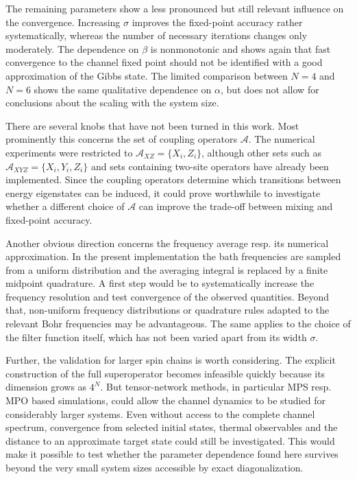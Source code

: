 \documentclass[12pt,a4paper]{article}
\begin{document}
The remaining parameters show a less pronounced but still relevant influence on the convergence. Increasing $\sigma$ improves the fixed-point accuracy rather systematically, whereas the number of necessary iterations changes only moderately. The dependence on $\beta$ is nonmonotonic and shows again that fast convergence to the channel fixed point should not be identified with a good approximation of the Gibbs state. The limited comparison between $N=4$ and $N=6$ shows the same qualitative dependence on $\alpha$, but does not allow for conclusions about the scaling with the system size.

There are several knobs that have not been turned in this work. Most prominently this concerns the set of coupling operators $\mathcal{A}$. The numerical experiments were restricted to $\mathcal{A}_{XZ}=\{X_i,Z_i\}$,
although other sets such as $\mathcal{A}_{XYZ}=\{X_i,Y_i,Z_i\}$
and sets containing two-site operators have already been implemented. Since the coupling operators determine which transitions between energy eigenstates can be induced, it could prove worthwhile to investigate whether a different choice of $\mathcal{A}$ can improve the trade-off between mixing and fixed-point accuracy.

Another obvious direction concerns the frequency average resp. its numerical approximation. In the present implementation the bath frequencies are sampled from a uniform distribution and the averaging integral is replaced by a finite midpoint quadrature. A first step would be to systematically increase the frequency resolution and test convergence of the observed quantities. Beyond that, non-uniform frequency distributions or quadrature rules adapted to the relevant Bohr frequencies may be advantageous. The same applies to the choice of  the filter function itself, which has not been varied apart from its width $\sigma$.

Further, the validation for larger spin chains is %
worth considering. The explicit construction of the full superoperator becomes infeasible quickly because its dimension grows as $4^N$. But tensor-network methods, in particular MPS resp. MPO based simulations, could allow the channel dynamics to be studied for considerably larger systems. Even without access to the complete channel spectrum, convergence from selected initial states, thermal observables and the distance to an approximate target state could still be investigated. This would make it possible to test whether the parameter dependence found here survives beyond the very small system sizes accessible by exact diagonalization.
\end{document}
